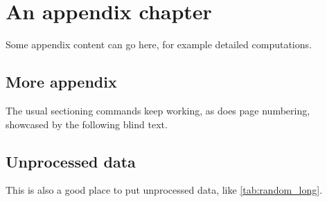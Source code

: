 \chapter{An appendix chapter}

Some appendix content can go here, for example detailed computations.

\section{More appendix}

The usual sectioning commands keep working, as does page numbering, showcased by the
following blind text.

\Blindtext

\section{Unprocessed data}
\label{ch:appendix_table}

This is also a good place to put unprocessed data, like \cref{tab:random_long}.

\clearpage

